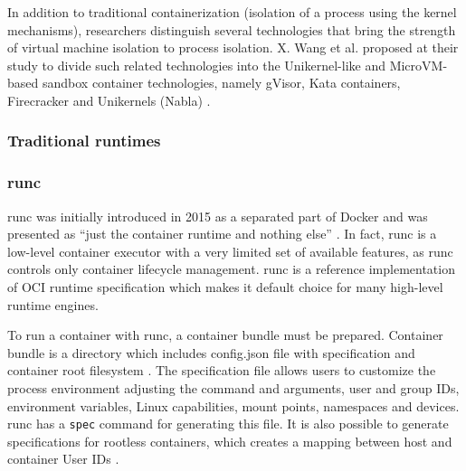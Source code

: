 In addition to traditional containerization (isolation of a process using the kernel mechanisms), researchers distinguish several technologies that bring the strength of virtual machine isolation to process isolation. X. Wang et al. proposed at their study to divide such related technologies into the Unikernel-like and MicroVM-based sandbox container technologies, namely gVisor, Kata containers, Firecracker and Unikernels (Nabla) \cite{j:1}.

\subsubsection{Traditional runtimes}

\subsubsection*{runc}

runc was initially introduced in 2015 as a separated part of Docker and was presented as ``just the container runtime and nothing else'' \cite{b:dockerrunc}. In fact, runc is a low-level container executor with a very limited set of available features, as runc controls only container lifecycle management. runc is a reference implementation of OCI runtime specification which makes it default choice for many high-level runtime engines.

To run a container with runc, a container bundle must be prepared. Container bundle is a directory which includes config.json file with specification and container root filesystem \cite{m:runc}. The specification file allows users to customize the process environment adjusting the command and arguments, user and group IDs, environment variables, Linux capabilities, mount points, namespaces and devices. runc has a \texttt{spec} command for generating this file. It is also possible to generate specifications for rootless containers, which creates a mapping between host and container User IDs \cite{j:2}.

